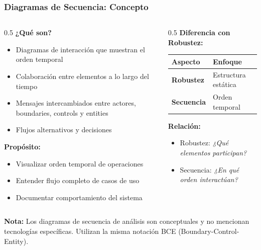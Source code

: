 \documentclass[aspectratio=169]{beamer}
\begin{document}
\begin{frame}
\frametitle{Diagramas de Secuencia: Concepto}

\begin{columns}
\begin{column}{0.5\textwidth}
\textbf{¿Qué son?}
\begin{itemize}
\item Diagramas de interacción que muestran el orden temporal
\item Colaboración entre elementos a lo largo del tiempo
\item Mensajes intercambiados entre actores, boundaries, controls y entities
\item Flujos alternativos y decisiones
\end{itemize}

\vspace{0.3cm}

\textbf{Propósito:}
\begin{itemize}
\item Visualizar orden temporal de operaciones
\item Entender flujo completo de casos de uso
\item Documentar comportamiento del sistema
\end{itemize}
\end{column}

\begin{column}{0.5\textwidth}
\textbf{Diferencia con Robustez:}
\begin{table}
\centering
\small
\begin{tabular}{p{2.5cm}p{3.5cm}}
\toprule
\textbf{Aspecto} & \textbf{Enfoque} \\
\midrule
\textbf{Robustez} & Estructura estática \\
\textbf{Secuencia} & Orden temporal \\
\bottomrule
\end{tabular}
\end{table}

\vspace{0.3cm}

\textbf{Relación:}
\begin{itemize}
\item Robustez: \textit{¿Qué elementos participan?}
\item Secuencia: \textit{¿En qué orden interactúan?}
\end{itemize}
\end{column}
\end{columns}

\vspace{0.3cm}

\begin{tcolorbox}[colback=blue!5, colframe=blue!50]
\textbf{Nota:} Los diagramas de secuencia de análisis son conceptuales y no mencionan tecnologías específicas. Utilizan la misma notación BCE (Boundary-Control-Entity).
\end{tcolorbox}

\end{frame}
\end{document}
